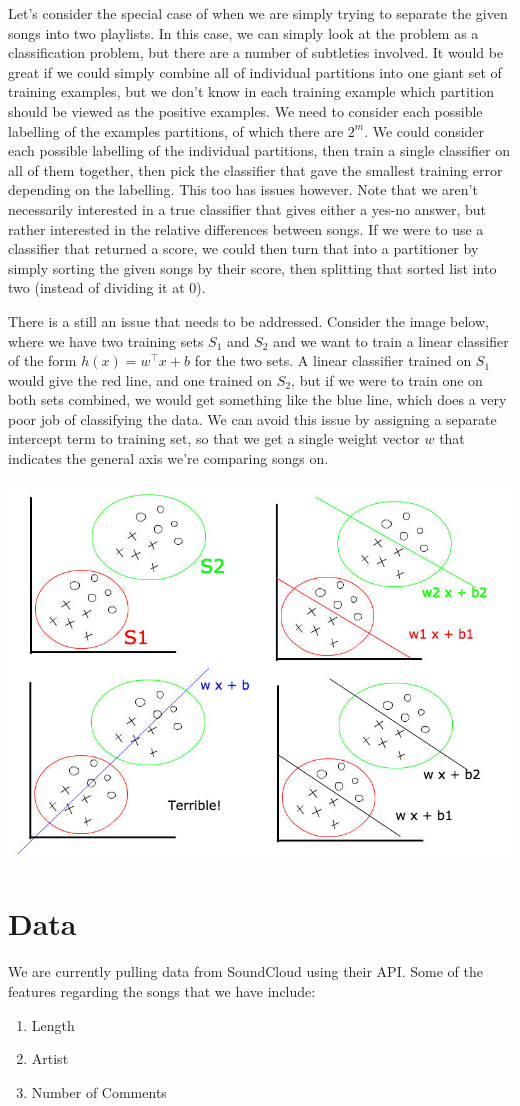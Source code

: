 \documentclass[12pt]{article}
\begin{document}
Let's consider the special case of when we are simply trying to separate the given songs into two playlists. In this case, we can simply look at the problem as a classification problem, but there are a number of subtleties involved. It would be great if we could simply combine all of individual partitions into one giant set of training examples, but we don't know in each training example which partition should be viewed as the positive examples. We need to consider each possible labelling of the examples partitions, of which there are $2^m$. We could consider each possible labelling of the individual partitions, then train a single classifier on all of them together, then pick the classifier that gave the smallest training error depending on the labelling. This too has issues however. Note that we aren't necessarily interested in a true classifier that gives either a yes-no answer, but rather interested in the relative differences between songs. If we were to use a classifier that returned a score, we could then turn that into a partitioner by simply sorting the given songs by their score, then splitting that sorted list into two (instead of dividing it at 0).

There is a still an issue that needs to be addressed. Consider the image below, where we have two training sets $S_1$ and $S_2$ and we want to train a linear classifier of the form $h(x) = w^\top x + b$ for the two sets. A linear classifier trained on $S_1$ would give the red line, and one trained on $S_2$, but if we were to train one on both sets combined, we would get something like the blue line, which does a very poor job of classifying the data. We can avoid this issue by assigning a separate intercept term to training set, so that we get a single weight vector $w$ that indicates the general axis we're comparing songs on.

\includegraphics[scale=0.5]{interceptTerms}

\section*{Data}

We are currently pulling data from SoundCloud using their API. Some of the features regarding the songs that we have include:
\begin{enumerate}
  \item Length
  \item Artist
  \item Number of Comments
\end{enumerate}
\end{document}
